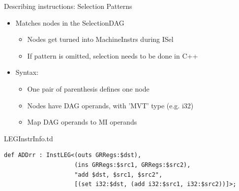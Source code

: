 
\begin{frame}[fragile]{Describing instructions: Selection Patterns}

\begin{itemize}
    \item Matches nodes in the SelectionDAG
    \begin{itemize}
        \item Nodes get turned into MachineInstrs during ISel
        \item If pattern is omitted, selection needs to be done in C++
    \end{itemize}
    \item Syntax:
    \begin{itemize}
        \item One pair of parenthesis defines one node
        \item Nodes have DAG operands, with 'MVT' type (e.g. i32)
        \item Map DAG operands to MI operands
    \end{itemize}
\end{itemize}

\begin{block}{LEGInstrInfo.td}
\begin{lstlisting}
def ADDrr : InstLEG<(outs GRRegs:$dst),
                    (ins GRRegs:$src1, GRRegs:$src2),
                    "add $dst, $src1, $src2",
                    [(set i32:$dst, (add i32:$src1, i32:$src2))]>;
\end{lstlisting}
\end{block}

\end{frame}


